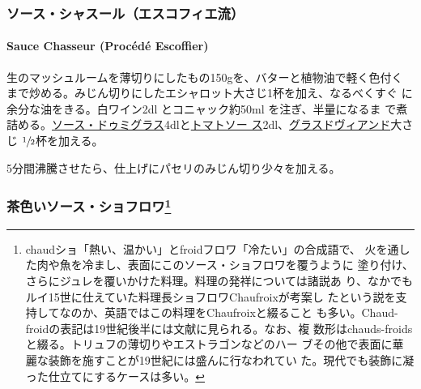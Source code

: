 \documentclass[twoside,12Q,b5j]{escoffierltjsbook}
\newenvironment{recette}{\begin{small}\begin{spacing}{1}\begin{multicols}{2}}{\end{multicols}\end{spacing}\end{small}}
\begin{document}
\begin{recette}
\vspace*{1.7\zw}

\subsubsection{ソース・シャスール（エスコフィエ流）}\label{ux30bdux30fcux30b9ux30b7ux30e3ux30b9ux30fcux30ebux30a8ux30b9ux30b3ux30d5ux30a3ux30a8ux6d41}

\paragraph{Sauce Chasseur (Procédé
Escoffier)}\label{sauce-chasseur-procede-escoffier}


生のマッシュルームを薄切りにしたもの150gを、バターと植物油で軽く色付く
まで炒める。みじん切りにしたエシャロット大さじ1杯を加え、なるべくすぐ
に余分な油をきる。白ワイン2dl とコニャック約50ml を注ぎ、半量になるま
で煮詰める。\protect\hyperlink{sauce-demi-glace}{ソース・ドゥミグラス}4dlと\protect\hyperlink{sauce-tomate}{トマトソー
ス}2dl、\protect\hyperlink{glace-de-viande}{グラスドヴィアンド}大さじ
\(\sfrac{1}{2}\)杯を加える。

5分間沸騰させたら、仕上げにパセリのみじん切り少々を加える。

\vspace*{1.7\zw}

\subsubsection[茶色いソース・ショフロワ]{\texorpdfstring{茶色いソース・ショフロワ\footnote{chaudショ「熱い、温かい」とfroidフロワ「冷たい」の合成語で、
  火を通した肉や魚を冷まし、表面にこのソース・ショフロワを覆うように
  塗り付け、さらにジュレを覆いかけた料理。料理の発祥については諸説あ
  り、なかでもルイ15世に仕えていた料理長ショフロワChaufroixが考案し
  たという説を支持してなのか、英語ではこの料理をChaufroixと綴ること
  も多い。Chaud-froidの表記は19世紀後半には文献に見られる。なお、複
  数形はchauds-froidsと綴る。トリュフの薄切りやエストラゴンなどのハー
  ブその他で表面に華麗な装飾を施すことが19世紀には盛んに行なわれてい
  た。現代でも装飾に凝った仕立てにするケースは多い。}}{茶色いソース・ショフロワ}}\label{ux8336ux8272ux3044ux30bdux30fcux30b9ux30b7ux30e7ux30d5ux30edux30ef15}


\end{recette}
\end{document}
